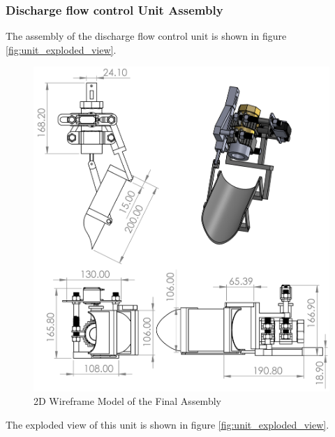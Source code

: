 \subsubsection{Discharge flow control Unit Assembly}
The assembly of the discharge flow control unit is shown in figure \ref{fig:unit_exploded_view}.
\begin{figure}[H]
    \centering
    \includegraphics[width=\textwidth,height=0.75\textheight,keepaspectratio]{Figures/DischargeFlowControlAssemblyDrawing.PNG}
    \caption{2D Wireframe Model of the Final Assembly}
    \label{fig:final assembly}
\end {figure}
The exploded view of this unit is shown in figure \ref{fig:unit_exploded_view}.
